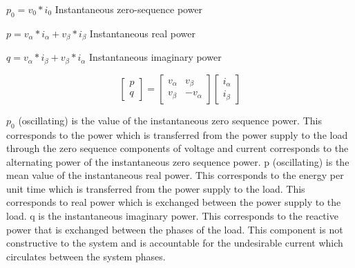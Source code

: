 \documentclass[journal,twoside]{IEEEtran}
\begin{document}
$p_0=v_0*i_0$ Instantaneous zero-sequence power

$p= v_{\alpha}*i_{\alpha}+v_{\beta}*i_{\beta}$ Instantaneous real power

$ q= v_{\alpha}*i_{\beta}+v_{\beta}*i_{\alpha}$ Instantaneous imaginary power


\[\begin{bmatrix} p\\q \end{bmatrix} =  \begin{bmatrix} v_{\alpha} & v_{\beta}\\v_{\beta} & -v_{\alpha} \end{bmatrix} \begin{bmatrix} i_{\alpha} \\i_{\beta} \end{bmatrix}
\]


$p_0$ (oscillating) is the value of the instantaneous zero
sequence power. This corresponds to the power which is
transferred from the power supply to the load through the zero
sequence components of voltage and current corresponds to the
alternating power of the instantaneous zero sequence power.
p (oscillating) is the mean value of the instantaneous real
power. This corresponds to the energy per unit time
which is transferred from the power supply to the load. This
corresponds to real power which is exchanged between the
power supply to the load. q is the instantaneous imaginary
power. This corresponds to the reactive power that is
exchanged between the phases of the load. This component is
not constructive to the system and is accountable for the
undesirable current which circulates between the system phases.
\end{document}
